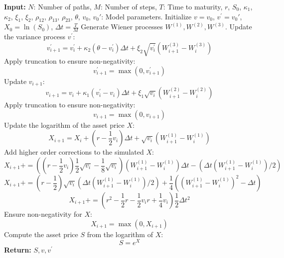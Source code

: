 \documentclass[graybox]{svmult}
\begin{document}
\begin{algorithm}[H]
\caption{AEMS-SOR Scheme for Gatheral DMR Model}
\label{alg:AEMS-SOR}
\begin{algorithmic}[1]
\State \textbf{Input:} $N$: Number of paths, $M$: Number of steps, $T$: Time to maturity, $r$, $S_0$, $\kappa_1$, $\kappa_2$, $\xi_1$, $\xi_2$, $\rho_{12}$, $\rho_{13}$, $\rho_{23}$, $\theta$, $v_0$, $v_0'$: Model parameters.
\State Initialize $v = v_0$, $v^{'} = v_0'$, $X_{0} = \ln(S_0)$, $\Delta t = \frac{T}{M}$
    \State Generate Wiener processes $W^{(1)}, W^{(2)}, W^{(3)}$.
    \State Update the variance process $v^{'}$:
    \[
    v^{'}_{i+1} = v^{'}_{i} + \kappa_2 (\theta - v^{'}_{i}) \Delta t + \xi_2 \sqrt{v^{'}_{i}} (W^{(3)}_{i+1} - W^{(3)}_{i})
    \]
    \State Apply truncation to ensure non-negativity:
    \[
    v^{'}_{i+1} = \max(0, v^{'}_{i+1})
    \]
    \State Update $v_{i+1}$:
    \[
    v_{i+1} = v_{i} + \kappa_1 (v^{'}_{i} - v_{i}) \Delta t + \xi_1 \sqrt{v_{i}} (W^{(2)}_{i+1} - W^{(2)}_{i})
    \]
    \State Apply truncation to ensure non-negativity:
    \[
    v_{i+1} = \max(0, v_{i+1})
    \]
    \State Update the logarithm of the asset price $X$:
    \[
    X_{i+1} = X_i + \left(r - \frac{1}{2} v_{i}\right) \Delta t + \sqrt{v_{i}} (W^{(1)}_{i+1} - W^{(1)}_{i})
    \]
    \State Add higher order corrections to the simulated $X$:
    \[
    X_{i+1} += \left(\left(r - \frac{1}{2} v_i\right) \frac{1}{2} \sqrt{v_i} - \frac{1}{8} \sqrt{v_i}\right) (W^{(1)}_{i+1} - W^{(1)}_{i}) \Delta t - (\Delta t (W^{(1)}_{i+1} - W^{(1)}_{i}) / 2)
    \]
    \[
    X_{i+1} += (r - \frac{1}{2}) \sqrt{v_i} (\Delta t (W^{(1)}_{i+1} - W^{(1)}_{i}) / 2) + \frac{1}{4} ((W^{(1)}_{i+1} - W^{(1)}_{i})^2 - \Delta t)
    \]
    \[
    X_{i+1} += (r^2 - \frac{1}{2} r - \frac{1}{2} v_i r + \frac{1}{4} v_i) \frac{1}{2} \Delta t^2
    \]
    \State Ensure non-negativity for $X$:
    \[
    X_{i+1} = \max(0, X_{i+1})
    \]
\EndFor
\State Compute the asset price $S$ from the logarithm of $X$:
\[
S = e^X
\]
\State \textbf{Return:} $S, v, v^{'}$
\end{algorithmic}
\end{algorithm}





\end{document}

